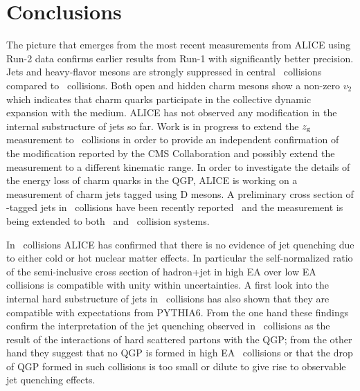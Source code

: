 \documentclass[10pt]{article}
\begin{document}
\section{Conclusions}
The picture that emerges from the most recent measurements from ALICE using Run-2 data confirms earlier results from Run-1 with significantly better precision.
Jets and heavy-flavor mesons are strongly suppressed in central \PbPb\ collisions compared to \pp\ collisions. Both open and hidden charm mesons show a non-zero $v_2$ which indicates 
that charm quarks participate in the collective dynamic expansion with the medium.
ALICE has not observed any modification in the internal substructure of jets so far. Work is in progress to extend the $z_{\rm g}$ measurement to \PbPb\ collisions
in order to provide an independent confirmation of the modification reported by the CMS Collaboration and possibly extend the measurement to a different kinematic range.
In order to investigate the details of the energy loss of charm quarks in the QGP, ALICE is working on a measurement of charm jets tagged using D mesons.
A preliminary cross section of \Dzero-tagged jets in \pp\ collisions have been recently reported~\cite{Aiola:2017} and the measurement is being extended to both \pPb\ and \PbPb\ collision systems.

In \pPb\ collisions ALICE has confirmed that there is no evidence of jet quenching due to either cold or hot nuclear matter effects.
In particular the self-normalized ratio of the semi-inclusive cross section of hadron+jet in high EA over low EA collisions is compatible with unity within uncertainties.
A first look into the internal hard substructure of jets in \pPb\ collisions has also shown that they are compatible with expectations from PYTHIA6.
From the one hand these findings confirm the interpretation of the jet quenching observed in \PbPb\ collisions as the result of the interactions of hard scattered partons
with the QGP; from the other hand they suggest that no QGP is formed in high EA \pPb\ collisions or that the drop of QGP formed in such collisions is too small or dilute to give rise to observable jet quenching effects.
 
\end{document}
